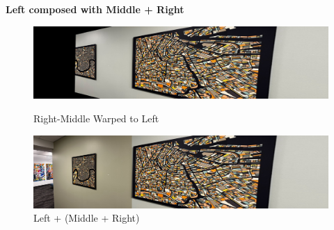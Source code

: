 \newpage
\textbf{Left composed with Middle + Right}
\begin{figure}[H]
  \centering
  \begin{minipage}{\textwidth}
    \includegraphics[width=\textwidth]{images/warped-right-3.jpg}
    \caption{Right-Middle Warped to Left}
    \label{fig:cv-desk}
  \end{minipage}
  \hfill
  \begin{minipage}{\textwidth}
    \includegraphics[width=\textwidth]{images/panorama-3.jpg}
    \caption{Left + (Middle + Right)}
    \label{fig:hp-desk}
  \end{minipage}
\end{figure}

